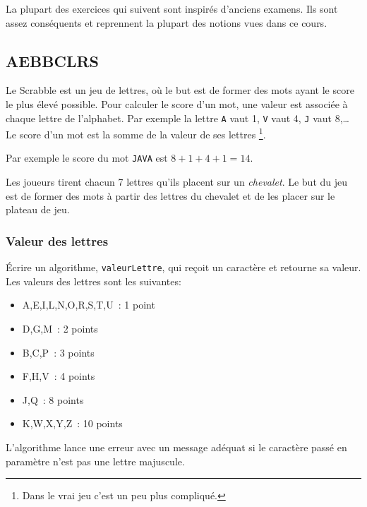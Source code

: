 
	La plupart des exercices qui suivent sont inspirés
	d’anciens examens.
	Ils sont assez conséquents et reprennent
	la plupart des notions vues dans ce cours.

	\subsection{AEBBCLRS}

		Le Scrabble est un jeu de lettres, où le but est de former des mots
		ayant le score le plus élevé possible.  Pour calculer le score d’un mot,
		une valeur est associée à chaque lettre de l’alphabet.  Par exemple la
		lettre \texttt{A} vaut 1, \texttt{V} vaut 4, \texttt{J} vaut 8,\dots{}
		Le score d’un mot est la somme de la valeur de ses lettres%
		\footnote{Dans le vrai jeu c’est un peu plus compliqué.}.

		Par exemple le score du mot \texttt{JAVA} est $8+1+4+1 = 14$.

		Les joueurs tirent chacun 7 lettres qu’ils placent sur un
		\emph{chevalet}.  Le but du jeu est de former des mots à partir des
		lettres du chevalet et de les placer sur le plateau de jeu.
	
		\subsubsection*{Valeur des lettres}
	
			\'Ecrire un algorithme, \texttt{valeurLettre}, 
			qui reçoit un caractère et retourne sa valeur. 
			Les valeurs des lettres sont les suivantes: 
			\begin{itemize}
			\item A,E,I,L,N,O,R,S,T,U~: 1 point
			\item D,G,M~: 2 points
			\item B,C,P~: 3 points
			\item F,H,V~: 4 points
			\item J,Q~: 8 points
			\item K,W,X,Y,Z~: 10 points
			\end{itemize}	

			L’algorithme lance une erreur avec un message adéquat 
			si le caractère passé en paramètre n’est pas une lettre majuscule.  
	
